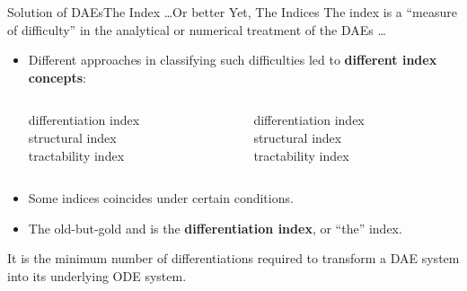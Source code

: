 \begin{frame}{Solution of \aclp{DAE}}{The Index \dots Or better Yet, The Indices}
  The index is a ``measure of difficulty'' in the analytical or numerical treatment of the \acp{DAE} \dots
  \begin{itemize}
    \item Different approaches in classifying such difficulties led to \textbf{different index concepts}:
    \begin{columns}
      \begin{column}[t]{0.45\textwidth}
        \centering\small
        differentiation index \\
        structural index \\
        tractability index
      \end{column}
      \begin{column}[t]{0.45\textwidth}
        \centering\small
        differentiation index \\
        structural index \\
        tractability index
      \end{column}
    \end{columns}
    \item Some indices coincides under certain conditions.
    \item The old-but-gold and is the \textbf{differentiation index}, or ``the'' index.
  \end{itemize}
  \vspace{0.5em}
  \begin{bbox}
    It is the minimum number of differentiations required to transform a \ac{DAE} system into its underlying \ac{ODE} system.
  \end{bbox}
\end{frame}

